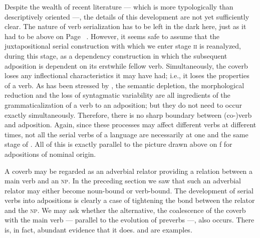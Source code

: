 Despite the wealth of recent literature — which is more typologically than descriptively oriented —, the details of this development are not yet sufficiently clear. The nature of verb serialization has to be left in the dark here, just as it had to be above on Page~\pageref{page37}\chk%
. However, it seems safe to assume that the juxtapositional serial construction with which we enter stage \textsc{ii} is reanalyzed, during this stage, as a dependency construction in which the subsequent adposition is dependent on its erstwhile fellow verb. Simultaneously, the coverb loses any inflectional characteristics it may have had; i.e., it loses the properties of a verb. As has been stressed by \citet[82--86]{Givón1975}, the semantic depletion, the morphological reduction and the loss of syntagmatic variability are all ingredients of the grammaticalization of a verb to an adposition; but they do not need to occur exactly simultaneously. Therefore, there is no sharp boundary between (co-)verb and adposition. Again, since these processes may affect different verbs at different times, not all the serial verbs of a language are necessarily at one and the same stage of . All of this is exactly parallel to the picture drawn above on \pageref{page102}\chk%
f  for adpositions of nominal origin.

A coverb may be regarded as an adverbial relator providing a relation between a main verb and an \textsc{np}. In the preceding section we saw that such an adverbial relator may either become noun-bound or verb-bound. The development of serial verbs into adpositions is clearly a case of tightening the bond between the relator and the \textsc{np}. We may ask whether the alternative, the coalescence of the coverb with the main verb — parallel to the evolution of preverbs —, also occurs. There is, in fact, abundant evidence that it does.  and  are examples.

